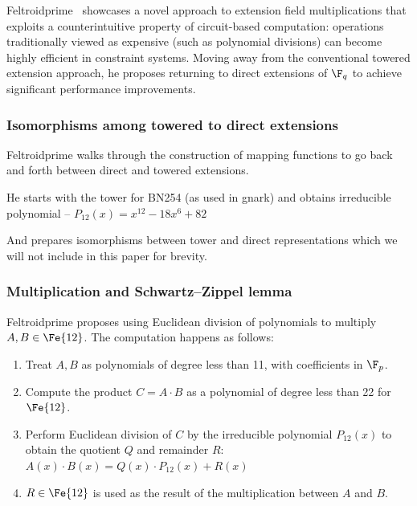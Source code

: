 Feltroidprime~\cite{FXFM23} showcases a novel approach to extension field multiplications that exploits a counterintuitive property of circuit-based computation: operations traditionally viewed as expensive (such as polynomial divisions) can become highly efficient in constraint systems. Moving away from the conventional towered extension approach, he proposes returning to direct extensions of $\F_{q}$ to achieve significant performance improvements.

\subsubsection{Isomorphisms among towered to direct extensions}

Feltroidprime walks through the construction of mapping functions to go back and forth between direct and towered extensions.





He starts with the tower for BN254 (as used in gnark\cite{gnark}) and obtains irreducible polynomial -- $P_{12}(x) = x^{12} - 18x^6 + 82$

And prepares isomorphisms between tower and direct representations\cite{FELT23ISO} which we will not include in this paper for brevity.

\subsubsection{Multiplication and Schwartz--Zippel lemma}

Feltroidprime proposes using Euclidean division of polynomials to multiply $A, B \in \Fe{12}$. The computation happens as follows:
\begin{enumerate}
    \item Treat $A, B$ as polynomials of degree less than 11, with coefficients in $\F_p$.
    \item Compute the product $C = A \cdot B$ as a polynomial of degree less than 22 for $\Fe{12}$.
    \item Perform Euclidean division of $C$ by the irreducible polynomial $P_{12}(x)$ to obtain the quotient $Q$ and remainder $R$:
    $
    \boxed{A(x) \cdot B(x) = Q(x) \cdot P_{12}(x) + R(x)}
    $
    \item $R \in \Fe{12}$ is used as the result of the multiplication between $A$ and $B$.
\end{enumerate}


